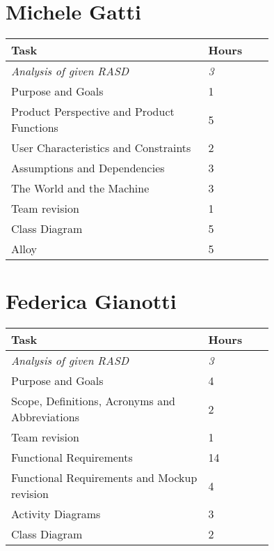 \section{Michele Gatti}

\smallskip
\begin{center}
\begin{tabular}{ | p{0.75\linewidth} | l | }
  \hline
    \textbf{Task} & \textbf{Hours }\\ \hline
    \textit{Analysis of given RASD} & \textit{3} \\ \hline
    Purpose and Goals & 1 \\ \hline
    Product Perspective and Product Functions & 5 \\ \hline
    User Characteristics and Constraints & 2 \\ \hline
    Assumptions and Dependencies & 3 \\ \hline
    The World and the Machine & 3 \\ \hline
    Team revision & 1 \\ \hline
    Class Diagram & 5 \\ \hline
    Alloy & 5 \\ \hline
\end{tabular}
\end{center}
\smallskip


\section{Federica Gianotti}

\smallskip
\begin{center}
\begin{tabular}{ | p{0.75\linewidth} | l | }
  \hline
    \textbf{Task} & \textbf{Hours }\\ \hline
    \textit{Analysis of given RASD} & \textit{3} \\ \hline
    Purpose and Goals & 4 \\ \hline
    Scope, Definitions, Acronyms and Abbreviations & 2 \\ \hline
    Team revision & 1 \\ \hline
    Functional Requirements & 14 \\ \hline
    Functional Requirements and Mockup revision & 4 \\ \hline
    Activity Diagrams & 3 \\ \hline
    Class Diagram & 2 \\ \hline
\end{tabular}
\end{center}
\smallskip

